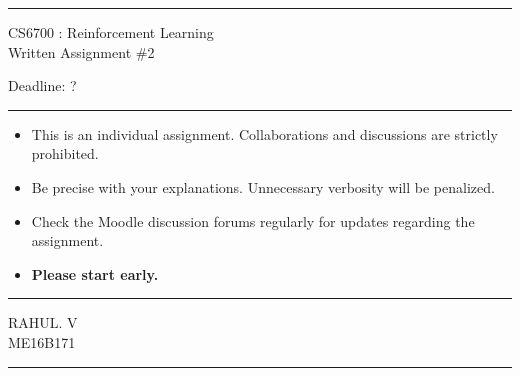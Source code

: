 \documentclass[solution,addpoints,12pt]{exam}
\begin{document}
\hrule
\vspace{1mm}
\noindent 
\begin{center}
{\Large CS6700 : Reinforcement Learning} \\
{\large Written Assignment \#2}
\end{center}
\vspace{1mm}
\noindent 
{Deadline: ?}

\vspace{2mm}
\hrule

{\small

\begin{itemize}\itemsep0mm
\item This is an individual assignment. Collaborations and discussions are strictly
prohibited.
\item Be precise with your explanations. Unnecessary verbosity will be penalized.
\item Check the Moodle discussion forums regularly for updates regarding the assignment.
\item \textbf{Please start early.}

\end{itemize}
}

\hrule

\vspace{3mm}
 RAHUL. V \\[1mm]
 ME16B171 \\
\hrule
\end{document}
